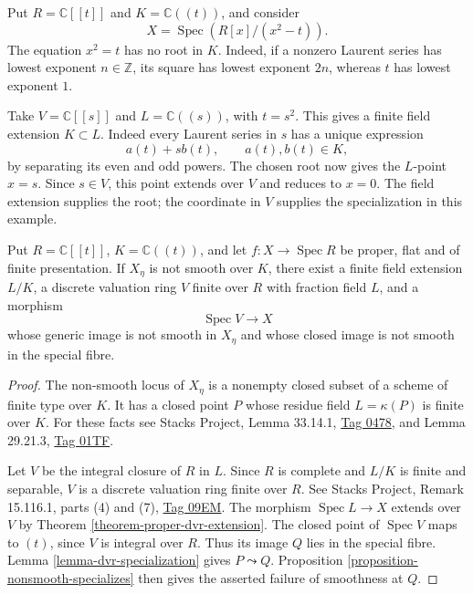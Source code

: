 \begin{example}
\label{example-specialization-base-change}
Put $R=\mathbb{C}[[t]]$ and
$K=\mathbb{C}((t))$, and consider
$$
X=\operatorname{Spec}(R[x]/(x^2-t)).
$$
The equation $x^2=t$ has no root in $K$.
Indeed, if a nonzero Laurent series has
lowest exponent $n\in\mathbb{Z}$, its
square has lowest exponent $2n$,
whereas $t$ has lowest exponent $1$.

Take $V=\mathbb{C}[[s]]$ and
$L=\mathbb{C}((s))$, with $t=s^2$.
This gives a finite field extension
$K\subset L$.
Indeed every Laurent series in $s$
has a unique expression
$$
a(t)+s b(t),\qquad a(t),b(t)\in K,
$$
by separating its even and odd powers.
The chosen root now gives the
$L$-point $x=s$.
Since $s\in V$, this point extends
over $V$ and reduces to $x=0$.
The field extension supplies the root;
the coordinate in $V$ supplies the
specialization in this example.
\end{example}

\begin{corollary}
\label{corollary-proper-singular-limit}
Put $R=\mathbb{C}[[t]]$,
$K=\mathbb{C}((t))$, and let
$f:X\to\operatorname{Spec}R$ be proper,
flat and of finite presentation.
If $X_\eta$ is not smooth over $K$,
there exist a finite field extension
$L/K$, a discrete valuation ring $V$
finite over $R$ with fraction field $L$,
and a morphism
$$
\operatorname{Spec}V\longrightarrow X
$$
whose generic image is not smooth
in $X_\eta$ and whose closed image
is not smooth in the special fibre.
\end{corollary}

\begin{proof}
The non-smooth locus of $X_\eta$ is a
nonempty closed subset of a scheme of
finite type over $K$.
It has a closed point $P$ whose residue
field $L=\kappa(P)$ is finite over $K$.
For these facts see Stacks Project,
Lemma 33.14.1,
\href{https://stacks.math.columbia.edu/tag/%
0478}{Tag 0478},
and Lemma 29.21.3,
\href{https://stacks.math.columbia.edu/tag/%
01TF}{Tag 01TF}.

Let $V$ be the integral closure of $R$
in $L$.
Since $R$ is complete and $L/K$ is
finite and separable, $V$ is a discrete
valuation ring finite over $R$.
See Stacks Project, Remark 15.116.1,
parts (4) and (7),
\href{https://stacks.math.columbia.edu/tag/%
09EM}{Tag 09EM}.
The morphism
$\operatorname{Spec}L\to X$ extends
over $V$ by Theorem
\ref{theorem-proper-dvr-extension}.
The closed point of
$\operatorname{Spec}V$ maps to $(t)$,
since $V$ is integral over $R$.
Thus its image $Q$ lies in the
special fibre.
Lemma \ref{lemma-dvr-specialization}
gives $P\leadsto Q$.
Proposition
\ref{proposition-nonsmooth-specializes}
then gives the asserted failure of
smoothness at $Q$.
\end{proof}

